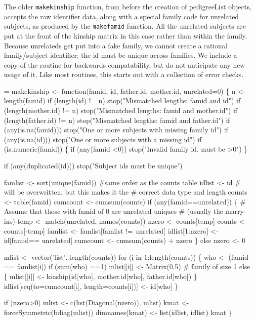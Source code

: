 \documentclass{article}
\begin{document}
The older \Verb!makekinship! function,
from before the creation of pedigreeList objects,
accepts the raw identifier data, along with a special family code
for unrelated subjects, as produced by the \Verb!makefamid! function.
All the unrelated subjects are put at the front of the kinship matrix
in this case rather than within the family.
Because unrelateds get put into a fake family, we cannot create a
rational family/subject identifier; the id must be unique across
families.
We include a copy of the routine for backwards compatability, but
do not anticipate any new usage of it.
Like most routines, this starts out with a collection of error checks.
\begin{nwchunk}
=
 makekinship <- function(famid, id, father.id, mother.id, unrelated=0) \{
     n <- length(famid)
     if (length(id)    != n) stop("Mismatched lengths: famid and id")
     if (length(mother.id) != n) stop("Mismatched lengths: famid and mother.id")
     if (length(father.id) != n) stop("Mismatched lengths: famid and father.id")
     if (any(is.na(famid)))  stop("One or more subjects with missing family id")
     if (any(is.na(id)))     stop("One or more subjects with a missing id")
     if (is.numeric(famid)) \{
         if (any(famid <0))      stop("Invalid family id, must be >0")
         \}
 
     if (any(duplicated(id))) stop("Subject ids must be unique")
 
     famlist <- sort(unique(famid))  #same order as the counts table
     idlist <- id            # will be overwritten, but this makes it the
                             #  correct data type and length
     counts <- table(famid)
     cumcount <- cumsum(counts)    
      if (any(famid==unrelated)) \{
         # Assume that those with famid of 0 are unrelated uniques
         #   (usually the marry-ins)
         temp <- match(unrelated, names(counts))
         nzero <- counts[temp]    
         counts <- counts[-temp]
         famlist <- famlist[famlist != unrelated]
         idlist[1:nzero] <- id[famid== unrelated]
         cumcount <- cumsum(counts) + nzero
         \}
     else nzero <- 0
     
     mlist <- vector('list', length(counts))
     for (i in 1:length(counts)) \{
         who <- (famid == famlist[i])
         if (sum(who) ==1) mlist[[i]] <- Matrix(0.5)  # family of size 1
         else \{
             mlist[[i]] <- kinship(id[who], mother.id[who], father.id[who])
             \}
         idlist[seq(to=cumcount[i], length=counts[i])] <- id[who]
         \}
 
     if (nzero>0) mlist <- c(list(Diagonal(nzero)), mlist)
     kmat <- forceSymmetric(bdiag(mlist))
     dimnames(kmat) <- list(idlist, idlist)
     kmat
 \}
\end{nwchunk}
\end{document}
